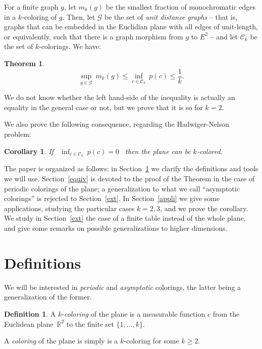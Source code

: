 \documentclass[a4paper,11pt]{article}
\newtheorem{cons}{Corollary}
\newtheorem*{theo*}{Theorem}
\theoremstyle{definition}
\newtheorem{definition}{Definition}
\theoremstyle{remark}
\newcommand{\R}{\mathbb{R}}
\newcommand{\C}{\mathcal{C}}
\newcommand{\Ca}{\mathcal{C}}
\begin{document}
For a finite graph $g$, let $m_k(g)$ be the smallest fraction of monochromatic
edges in a $k$-coloring of $g$. Then, let $\mathcal{G}$ be the set of 
\textit{unit distance graphs} -- that is, graphs that can be embedded in the
Euclidian plane with all edges of unit-length, or equivalently, such that there is
a graph morphism from $g$ to $E^2$ -- and let $\C_k$ be the set of $k$-colorings. We
have:
\begin{theo*}
$$ \sup_{g \in \mathcal{G}} \ m_k(g) \leq \inf_{c \in \C_k} \ p(c) \leq \frac{1}{k}. $$
\end{theo*}
We do not know whether the left hand-side of the inequality is actually an equality in
the general case or not, but we prove that it is so for $k=2$.

We also prove the following consequence, regarding the Hadwiger-Nelson problem:
\begin{cons} \label{con}
If \ $\inf_{c \in \Ca_k} \ p(c) = 0$ \ then the plane can be $k$-colored.
\end{cons}

The paper is organized as follows: in Section~\ref{defsection} we clarify the
definitions and tools we will use. Section~\ref{equiv} is devoted to the proof 
of the Theorem in the case of periodic colorings of the plane; a generalization
to what we call ``asymptotic colorings'' is rejected to Section~\ref{ext}.
In Section~\ref{appli} we give some applications, studying the particular cases $k=2,3$,
and we prove the corollary.
We study in Section~\ref{ext} the case of a finite table instead of the whole plane, 
and give some remarks on possible 
generalizations to higher dimensions.

\section{Definitions} \label{defsection}
We will be interested in \textit{periodic} and \textit{asymptotic} colorings,
the latter being a generalization of the former.
\begin{definition}
A $k$-\textit{coloring} of the plane is a measurable function $c$ from the Euclidean 
plane~$\R ^2$ to the finite set $\{1, \dots , k \}$.

A \textit{coloring} of the plane is simply is a $k$-coloring for some $k \geq 2$.
\end{definition}
\end{document}
